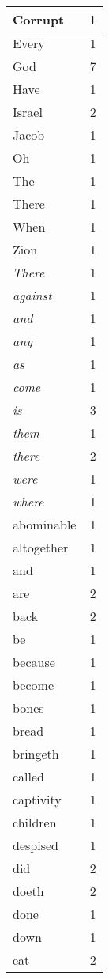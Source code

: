 \begin{center}
\begin{longtable}{l|r}
\hline \hline
\endlastfoot
Corrupt & 1 \\ \hline
Every & 1 \\ \hline
God & 7 \\ \hline
Have & 1 \\ \hline
Israel & 2 \\ \hline
Jacob & 1 \\ \hline
Oh & 1 \\ \hline
The & 1 \\ \hline
There & 1 \\ \hline
When & 1 \\ \hline
Zion & 1 \\ \hline
\emph{There} & 1 \\ \hline
\emph{against} & 1 \\ \hline
\emph{and} & 1 \\ \hline
\emph{any} & 1 \\ \hline
\emph{as} & 1 \\ \hline
\emph{come} & 1 \\ \hline
\emph{is} & 3 \\ \hline
\emph{them} & 1 \\ \hline
\emph{there} & 2 \\ \hline
\emph{were} & 1 \\ \hline
\emph{where} & 1 \\ \hline
abominable & 1 \\ \hline
altogether & 1 \\ \hline
and & 1 \\ \hline
are & 2 \\ \hline
back & 2 \\ \hline
be & 1 \\ \hline
because & 1 \\ \hline
become & 1 \\ \hline
bones & 1 \\ \hline
bread & 1 \\ \hline
bringeth & 1 \\ \hline
called & 1 \\ \hline
captivity & 1 \\ \hline
children & 1 \\ \hline
despised & 1 \\ \hline
did & 2 \\ \hline
doeth & 2 \\ \hline
done & 1 \\ \hline
down & 1 \\ \hline
eat & 2 \\ \hline

\end{longtable}
\end{center}
